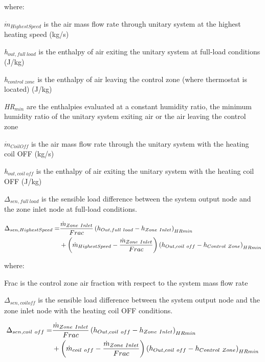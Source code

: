 where:

\emph{\({\dot m_{HighestSpeed}}\)} is the air mass flow rate through unitary system at the highest heating speed (kg/s)

\emph{h\(_{out, full~load}\)} is the enthalpy of air exiting the unitary system at full-load conditions (J/kg)

\emph{h\(_{control~zone}\)} is the enthalpy of air leaving the control zone (where thermostat is located) (J/kg)

\emph{HR\(_{min}\)} are the enthalpies evaluated at a constant humidity ratio, the minimum humidity ratio of the unitary system exiting air or the air leaving the control zone

\({\dot m_{CoilOff}}\) is the air mass flow rate through the unitary system with the heating coil OFF (kg/s)

\emph{h\(_{out,coil~off}\)} is the enthalpy of air exiting the unitary system with the heating coil OFF (J/kg)

\(\Delta_{sen,full~load}\) is the sensible load difference between the system output node and the zone inlet node at full-load conditions.

\begin{equation}
  \begin{split}
    \Delta_{sen,HighestSpeed} =& \frac{\dot{m}_{Zone~Inlet}}{Frac} \left(h_{Out,full~load} - h_{Zone~Inlet}\right)_{HRmin} \\
                              &+ \left(\dot{m}_{HighestSpeed} - \frac{\dot{m}_{Zone~Inlet}}{Frac}\right) \left(h_{Out,coil~off} - h_{Control~Zone}\right)_{HRmin}
  \end{split}
\end{equation}

where:

Frac is the control zone air fraction with respect to the system mass flow rate

\(\Delta_{sen,coil off}\) is the sensible load difference between the system output node and the zone inlet node with the heating coil OFF conditions.

\begin{equation}
  \begin{split}
    \Delta_{sen,coil~off} =& \frac{\dot{m}_{Zone~Inlet}}{Frac} \left(h_{Out,coil~off} - h_{Zone~Inlet}\right)_{HRmin} \\
                              &+ \left(\dot{m}_{coil~off} - \frac{\dot{m}_{Zone~Inlet}}{Frac}\right) \left(h_{Out,coil~off} - h_{Control~Zone}\right)_{HRmin}
  \end{split}
\end{equation}

